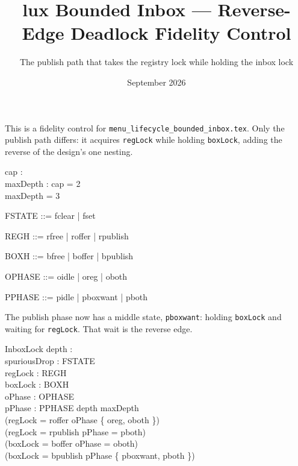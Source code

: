 \documentclass[a4paper,10pt,fleqn]{article}
\begin{document}
\title{lux Bounded Inbox --- Reverse-Edge Deadlock Fidelity Control}
\author{The publish path that takes the registry lock while holding the inbox lock}
\date{September 2026}
\maketitle

This is a fidelity control for \texttt{menu\_lifecycle\_bounded\_inbox.tex}. Only
the publish path differs: it acquires \texttt{regLock} while holding
\texttt{boxLock}, adding the reverse of the design's one nesting.

\begin{axdef}
  cap : \nat \\
  maxDepth : \nat
\where
  cap = 2 \\
  maxDepth = 3
\end{axdef}

\begin{zed}
  FSTATE ::= fclear | fset
\end{zed}

\begin{zed}
  REGH ::= rfree | roffer | rpublish
\end{zed}

\begin{zed}
  BOXH ::= bfree | boffer | bpublish
\end{zed}

\begin{zed}
  OPHASE ::= oidle | oreg | oboth
\end{zed}

\begin{zed}
  PPHASE ::= pidle | pboxwant | pboth
\end{zed}

The publish phase now has a middle state, \texttt{pboxwant}: holding
\texttt{boxLock} and waiting for \texttt{regLock}. That wait is the reverse edge.

\begin{schema}{InboxLock}
  depth : \nat \\
  spuriousDrop : FSTATE \\
  regLock : REGH \\
  boxLock : BOXH \\
  oPhase : OPHASE \\
  pPhase : PPHASE
\where
  depth \leq maxDepth \\
  (regLock = roffer \iff oPhase \in \{ oreg, oboth \}) \\
  (regLock = rpublish \iff pPhase = pboth) \\
  (boxLock = boffer \iff oPhase = oboth) \\
  (boxLock = bpublish \iff pPhase \in \{ pboxwant, pboth \})
\end{schema}
\end{document}
